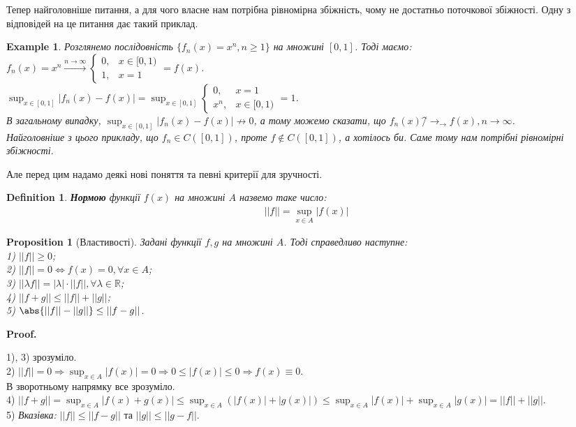 \documentclass[a4paper, 10pt]{article}
\makeatletter
\def\huge{\displaystyle}
\def\qed{$\blacksquare$}
\theoremstyle{theoremdd}
\theoremstyle{theoremdd}
\theoremstyle{theoremdd}
\newtheorem{definition}[theorem]{Definition}
\theoremstyle{theoremdd}
\theoremstyle{theoremdd}
\newtheorem{example}[theorem]{Example}
\theoremstyle{theoremdd}
\newtheorem{proposition}[theorem]{Proposition}
\theoremstyle{theoremdd}
\theoremstyle{theoremdd}
\theoremstyle{theoremdd}
\renewenvironment{proof}[1][Proof.\\]{\par
\pushQED{\hfill \qed}%
\normalfont \topsep6\p@\@plus6\p@\relax
\trivlist
\item\relax
{\bfseries
#1\@addpunct{.}}\hspace\labelsep\ignorespaces
}{%
\popQED\endtrivlist\@endpefalse
}
\makeatother
\begin{document}
Тепер найголовніше питання, а для чого власне нам потрібна рівномірна збіжність, чому не достатньо поточкової збіжності. Одну з відповідей на це питання дає такий приклад.

\begin{example}
Розглянемо послідовність $\{f_n(x) = x^n, n \geq 1\}$ на множині $[0,1]$. Тоді маємо:\\
$f_n(x) = x^n \overset{n \to \infty}{\longrightarrow} \begin{cases} 0, & x \in [0,1) \\ 1, & x = 1 \end{cases} = f(x)$.\\
$\huge\sup_{x \in [0,1]} |f_n(x)-f(x)| = \sup_{x \in [0,1]}\begin{cases} 0, & x = 1 \\ x^n, & x \in [0,1) \end{cases} = 1$.\\
В загальному випадку, $\huge\sup_{x \in [0,1]} |f_n(x)-f(x)| \not\to 0$, а тому можемо сказати, що $f_n(x) \not^\rightarrow_\rightarrow f(x), n \to \infty$.\bigskip \\
Найголовніше з цього прикладу, що $f_n \in C([0,1])$, проте $f \not\in C([0,1])$, а хотілось би. Саме тому нам потрібні рівномірні збіжності.
\end{example}

Але перед цим надамо деякі нові поняття та певні критерії для зручності.

\begin{definition}
\textbf{Нормою} функції $f(x)$ на множині $A$ назвемо таке число:
\begin{align*}
||f|| = \sup_{x \in A} |f(x)|
\end{align*}
\end{definition}

\begin{proposition}[Властивості]
Задані функції $f,g$ на множині $A$. Тоді справедливо наступне:\\
1) $||f|| \geq 0$;\\
2) $||f|| = 0 \iff f(x) = 0, \forall x \in A$;\\
3) $||\lambda f|| = |\lambda| \cdot ||f||, \forall \lambda \in \mathbb{R}$;\\
4) $||f+g|| \leq ||f|| + ||g||$;\\
5) $\abs{||f||-||g||} \leq ||f-g||$.
\end{proposition}

\begin{proof}
1), 3) зрозуміло. \\
2) $||f|| = 0 \Rightarrow \huge \sup_{x \in A}|f(x)| = 0 \Rightarrow 0 \leq |f(x)| \leq 0 \Rightarrow f(x) \equiv 0$.\\
В зворотньому напрямку все зрозуміло.\\
4) $||f+g|| = \huge \sup_{x \in A}|f(x)+g(x)| \leq \sup_{x \in A}(|f(x)| + |g(x)|) \leq \sup_{x \in A}|f(x)| +\sup_{x \in A}|g(x)| = ||f|| + ||g||$.\\
5) \textit{Вказівка:} $||f|| \leq ||f-g||$ та $||g|| \leq ||g-f||$.
\end{proof}
\end{document}
